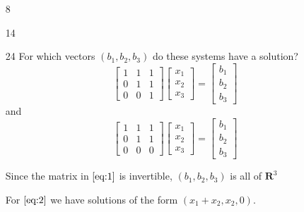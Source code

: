 \documentclass[12pt,letterpaper]{article}
\begin{document}
\begin{enumerate}[label=\S 2.\arabic*]
\begin{enumerate}
        \item [8]
        \item [14]
        \item [24]
          For which vectors $(b_1, b_2, b_3)$ do these systems have a solution?
          \[
            \left[
            \begin{array}{ccc}
              1 & 1 & 1  \\
              0 & 1 & 1  \\
              0 & 0 & 1
            \end{array}
            \right]
            \left[
            \begin{array}{c}
              x_1 \\
              x_2 \\
              x_3
            \end{array}
            \right]
            =
            \left[
            \begin{array}{c}
              b_1 \\
              b_2 \\
              b_3
            \end{array}
            \right]
            \tag{1}\label{eq:1}
          \]
          and
          \[
            \left[
            \begin{array}{ccc}
              1 & 1 & 1  \\
              0 & 1 & 1  \\
              0 & 0 & 0
            \end{array}
            \right]
            \left[
            \begin{array}{c}
              x_1 \\
              x_2 \\
              x_3
            \end{array}
            \right]
            =
            \left[
            \begin{array}{c}
              b_1 \\
              b_2 \\
              b_3
            \end{array}
            \right]
            \tag{2}\label{eq:2}
          \]

          Since the matrix in $\eqref{eq:1}$ is invertible, $(b_1, b_2, b_3)$ is all of $\mathbf{R}^3$

          For $\eqref{eq:2}$ we have solutions of the form
          $(x_1 + x_2, x_2, 0)$.


\end{enumerate}
\end{enumerate}
\end{document}
